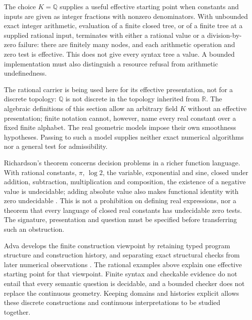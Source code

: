 The choice $K=\mathbb Q$ supplies a useful effective starting point when
constants and inputs are given as integer fractions with nonzero
denominators.  With unbounded exact integer arithmetic, evaluation of a finite
closed tree, or of a finite tree at a supplied rational input, terminates with
either a rational value or a division-by-zero failure: there are finitely many
nodes, and each arithmetic operation and zero test is effective.  This does
not give every syntax tree a value.  A bounded implementation must also
distinguish a resource refusal from arithmetic undefinedness.

The rational carrier is being used here for its effective presentation,
not for a discrete topology: $\mathbb Q$ is not discrete in the topology
inherited from $\mathbb R$.  The algebraic definitions of this section allow
an arbitrary field $K$ without an effective presentation; finite notation
cannot, however, name every real constant over a fixed finite alphabet.
The real geometric models impose their own smoothness hypotheses.  Passing
to such a model supplies neither exact numerical algorithms nor a general
test for admissibility.

Richardson's theorem concerns decision problems in a richer function
language.  With rational constants, $\pi$, $\log 2$, the variable, exponential
and sine, closed under addition, subtraction, multiplication and composition,
the existence of a negative value is undecidable; adding absolute value also
makes functional identity with zero undecidable
\cite{Richardson1968UndecidableProblems}.  This is not a prohibition on
defining real expressions, nor a theorem that every language of closed real
constants has undecidable zero tests.  The signature, presentation and
question must be specified before transferring such an obstruction.

Adva develops the finite construction viewpoint by retaining typed program
structure and construction history, and separating exact structural checks
from later numerical observations \cite{Yuan2026AdvaProgramProcessCore}.
The rational examples above explain one effective starting point for that
viewpoint.  Finite syntax and checkable evidence do not entail that every
semantic question is decidable, and a bounded checker does not replace the
continuous geometry.  Keeping domains and histories explicit allows these
discrete constructions and continuous interpretations to be studied together.
